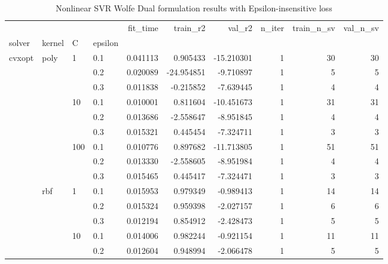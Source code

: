 \begin{table}[h!]
\centering
\caption{Nonlinear SVR Wolfe Dual formulation results with Epsilon-insensitive loss}
\label{nonlinear_dual_svr_cv_results}
\begin{tabular}{llllrrrrrr}
\toprule
       &     &     &     &     fit\_time &   train\_r2 &     val\_r2 &    n\_iter &  train\_n\_sv &  val\_n\_sv \\
solver & kernel & C & epsilon &              &            &            &           &             &           \\
\midrule
cvxopt & poly & 1   & 0.1 &     0.041113 &   0.905433 & -15.210301 &         1 &          30 &        30 \\
       &     &     & 0.2 &     0.020089 & -24.954851 &  -9.710897 &         1 &           5 &         5 \\
       &     &     & 0.3 &     0.011838 &  -0.215852 &  -7.639445 &         1 &           4 &         4 \\
       &     & 10  & 0.1 &     0.010001 &   0.811604 & -10.451673 &         1 &          31 &        31 \\
       &     &     & 0.2 &     0.013686 &  -2.558647 &  -8.951845 &         1 &           4 &         4 \\
       &     &     & 0.3 &     0.015321 &   0.445454 &  -7.324711 &         1 &           3 &         3 \\
       &     & 100 & 0.1 &     0.010776 &   0.897682 & -11.713805 &         1 &          51 &        51 \\
       &     &     & 0.2 &     0.013330 &  -2.558605 &  -8.951984 &         1 &           4 &         4 \\
       &     &     & 0.3 &     0.015465 &   0.445417 &  -7.324471 &         1 &           3 &         3 \\
       & rbf & 1   & 0.1 &     0.015953 &   0.979349 &  -0.989413 &         1 &          14 &        14 \\
       &     &     & 0.2 &     0.015324 &   0.959398 &  -2.027157 &         1 &           6 &         6 \\
       &     &     & 0.3 &     0.012194 &   0.854912 &  -2.428473 &         1 &           5 &         5 \\
       &     & 10  & 0.1 &     0.014006 &   0.982244 &  -0.921154 &         1 &          11 &        11 \\
       &     &     & 0.2 &     0.012604 &   0.948994 &  -2.066478 &         1 &           5 &         5 \\

\end{tabular}
\end{table}
